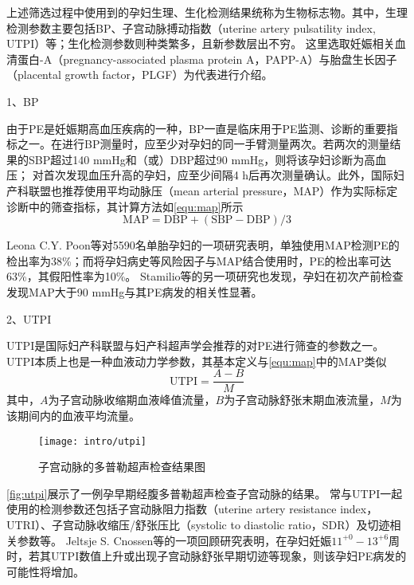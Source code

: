 上述筛选过程中使用到的孕妇生理、生化检测结果统称为生物标志物。其中，生理检测参数主要包括BP、子宫动脉搏动指数（uterine artery pulsatility index, UTPI）等；生化检测参数则种类繁多，且新参数层出不穷\cite{Rene2008,Zhong2015,Zeisler2016,Rana2012}。
这里选取妊娠相关血清蛋白-A（pregnancy-associated plasma protein A，PAPP-A）与胎盘生长因子（placental growth factor，PLGF）为代表进行介绍。

1、BP

由于PE是妊娠期高血压疾病的一种，BP一直是临床用于PE监测、诊断的重要指标之一\cite{OAG9,HDASOM,2000s1}。在进行BP测量时，应至少对孕妇的同一手臂测量两次。若两次的测量结果的SBP超过140 mmHg和（或）DBP超过90 mmHg，则将该孕妇诊断为高血压；
对首次发现血压升高的孕妇，应至少间隔4 h后再次测量确认\cite{OAG9}。此外，国际妇产科联盟也推荐使用平均动脉压（mean arterial pressure，MAP）作为实际标定诊断中的筛查指标\cite{FIGO}，其计算方法如\autoref{equ:map}所示
\begin{equation}
    \label{equ:map}
    \text{MAP}=\text{DBP}+(\text{SBP}-\text{DBP})/3
\end{equation}

Leona C.Y. Poon等\cite{Poon2008}对5590名单胎孕妇的一项研究表明，单独使用MAP检测PE的检出率为38\%；而将孕妇病史等风险因子与MAP结合使用时，PE的检出率可达63\%，其假阳性率为10\%。
Stamilio等\cite{Stamilio2000}的另一项研究也发现，孕妇在初次产前检查发现MAP大于90 mmHg与其PE病发的相关性显著。


2、UTPI

UTPI是国际妇产科联盟与妇产科超声学会推荐的对PE进行筛查的参数之一\cite{FIGO,Sotiriadis2019}。
UTPI本质上也是一种血液动力学参数，其基本定义与\autoref{equ:map}中的MAP类似\cite{Cnossen2008}
\begin{equation}
    \label{equ:utpi}
    \text{UTPI}=\frac{A-B}{M}
\end{equation}
其中，$A$为子宫动脉收缩期血液峰值流量，$B$为子宫动脉舒张末期血液流量，$M$为该期间内的血液平均流量。
\begin{figure}[htbp]
    \centering
    \texttt{[image: intro/utpi]}
    \caption{\label{fig:utpi}子宫动脉的多普勒超声检查结果图}
\end{figure}

\autoref{fig:utpi}展示了一例孕早期经腹多普勒超声检查子宫动脉的结果\cite{Sotiriadis2019}。
常与UTPI一起使用的检测参数还包括子宫动脉阻力指数（uterine artery resistance index，UTRI）、子宫动脉收缩压/舒张压比（systolic to diastolic ratio，SDR）及切迹相关参数等\cite{Cnossen2008}。
Jeltsje S. Cnossen等\cite{Cnossen2008}的一项回顾研究表明，在孕妇妊娠$11^{+0}-13^{+6}$周时，若其UTPI数值上升或出现子宫动脉舒张早期切迹等现象，则该孕妇PE病发的可能性将增加\cite{OAG9,Plasencia2008}。

